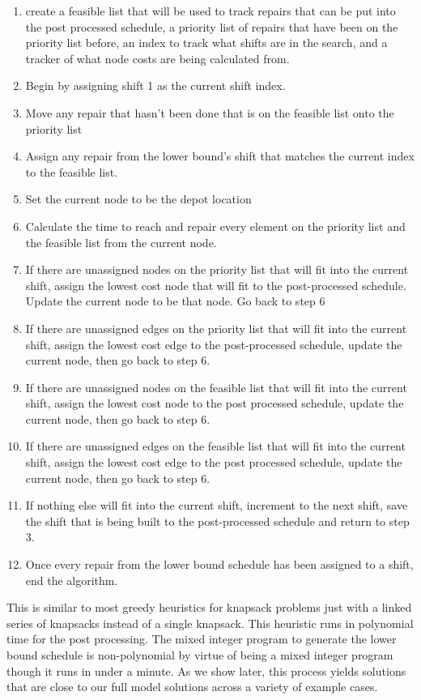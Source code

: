 \documentclass{article}
\begin{document}
	\begin{enumerate}
		\item create a feasible list that will be used to track repairs that can be put into the post processed schedule, a priority list of repairs that have been on the priority list before, an index to track what shifts are in the search, and a tracker of what node costs are being calculated from.
		\item Begin by assigning shift 1 as the current shift index.
		\item Move any repair that hasn't been done that is on the feasible list onto the priority list
		\item Assign any repair from the lower bound's shift that matches the current index to the feasible list.
		\item Set the current node to be the depot location
		\item Calculate the time to reach and repair every element on the priority list and the feasible list from the current node.
		\item If there are unassigned nodes on the priority list that will fit into the current shift, assign the lowest cost node that will fit to the post-processed schedule. Update the current node to be that node. Go back to step 6 
		\item If there are unassigned edges on the priority list that will fit into the current shift, assign the lowest cost edge to the post-processed schedule, update the current node, then go back to step 6.
		\item If there are unassigned nodes on the feasible list that will fit into the current shift, assign the lowest cost node to the post processed schedule, update the current node, then go back to step 6.
		\item If there are unassigned edges on the feasible list that will fit into the current shift, assign the lowest cost edge to the post processed schedule, update the current node, then go back to step 6.
		\item If nothing else will fit into the current shift, increment to the next shift, save the shift that is being built to the post-processed schedule and return to step 3.
		\item Once every repair from the lower bound schedule has been assigned to a shift, end the algorithm.
	\end{enumerate}
	
	This is  similar to most greedy heuristics for knapsack problems just with a linked series of knapsacks instead of a single knapsack. This heuristic runs in polynomial time for the post processing. The  mixed integer program to generate the lower bound schedule is non-polynomial by virtue of being a mixed integer program though it runs in under a minute. As we show later, this process yields solutions that are close to our full model solutions across a variety of example cases.
	
\end{document}
